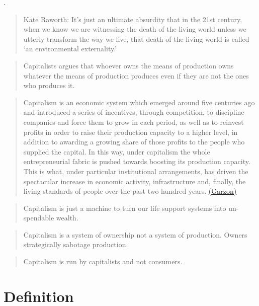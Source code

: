\documentclass[
]{book}
\begin{document}
.

\begin{quote}
Kate Raworth: It's just an ultimate absurdity that in the 21st century,
when we know we are witnessing the death of the living world
unless we utterly transform the way we live,
that death of the living world is called `an environmental externality.'
\end{quote}

\begin{quote}
Capitalists argues that whoever owns the means of
production owns whatever the means of production
produces even if they are not the ones who produces it.
\end{quote}

\begin{quote}
Capitalism is an economic system which emerged around five centuries ago and introduced a series of incentives, through competition, to discipline companies and force them to grow in each period, as well as to reinvest profits in order to raise their production capacity to a higher level, in addition to awarding a growing share of those profits to the people who supplied the capital. In this way, under capitalism the whole entrepreneurial fabric is pushed towards boosting its production capacity. This is what, under particular institutional arrangements, has driven the spectacular increase in economic activity, infrastructure and, finally, the living standards of people over the past two hundred years. \href{https://la-u.org/the-limits-to-growth-eco-socialism-or-barbarism/}{(Garzon)}
\end{quote}

\begin{quote}
Capitalism is just a machine to turn our life support systems into un-spendable wealth.
\end{quote}

\begin{quote}
Capitalism is a system of ownership not a system of production. Owners strategically sabotage production.
\end{quote}

\begin{quote}
Capitalism is run by capitalists and not consumers.
\end{quote}

\hypertarget{definition}{%
\section{Definition}\label{definition}}
\end{document}
